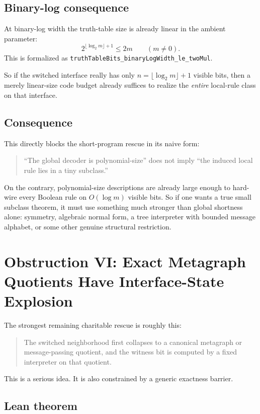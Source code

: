 \documentclass[11pt]{article}
\theoremstyle{remark}
\begin{document}
\subsection{Binary-log consequence}

At binary-log width the truth-table size is already linear in the ambient parameter:
\[
  2^{\lfloor \log_2 m \rfloor + 1} \le 2m \qquad (m \ne 0).
\]
This is formalized as
\texttt{truthTableBits\_binaryLogWidth\_le\_twoMul}.

So if the switched interface really has only \(n = \lfloor \log_2 m \rfloor + 1\) visible bits,
then a merely linear-size code budget already suffices to realize the \emph{entire} local-rule
class on that interface.

\subsection{Consequence}

This directly blocks the short-program rescue in its naive form:

\begin{quote}
``The global decoder is polynomial-size'' does not imply
``the induced local rule lies in a tiny subclass.''
\end{quote}

On the contrary, polynomial-size descriptions are already large enough to hard-wire every Boolean
rule on \(O(\log m)\) visible bits.  So if one wants a true small subclass theorem, it must use
something much stronger than global shortness alone: symmetry, algebraic normal form, a tree
interpreter with bounded message alphabet, or some other genuine structural restriction.

\section{Obstruction VI: Exact Metagraph Quotients Have Interface-State Explosion}

The strongest remaining charitable rescue is roughly this:
\begin{quote}
The switched neighborhood first collapses to a canonical metagraph or message-passing quotient,
and the witness bit is computed by a fixed interpreter on that quotient.
\end{quote}

This is a serious idea.  It is also constrained by a generic exactness barrier.

\subsection{Lean theorem}
\end{document}

